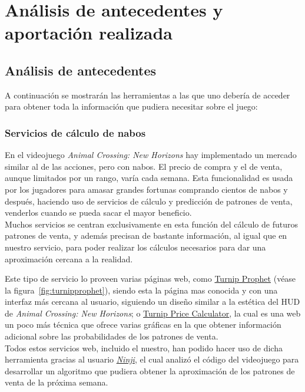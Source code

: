 \chapter{An\'alisis de antecedentes y aportaci\'on realizada}\label{analanteced}

\section{Análisis de antecedentes}

A continuación se mostrarán las herramientas a las que uno debería de acceder para obtener toda la información que pudiera necesitar sobre el juego:

\subsection{Servicios de cálculo de nabos}

En el videojuego \textit{Animal Crossing: New Horizons} hay implementado un mercado similar al de las acciones, pero con nabos. El precio de compra y el de venta, aunque limitados por un rango, varía cada semana. Esta funcionalidad es usada por los jugadores para amasar grandes fortunas comprando cientos de nabos y después, haciendo uso de servicios de cálculo y predicción de patrones de venta, venderlos cuando se pueda sacar el mayor beneficio.\\

Muchos servicios se centran exclusivamente en esta función del cálculo de futuros patrones de venta, y además precisan de bastante información, al igual que en nuestro servicio, para poder realizar los cálculos necesarios para dar una aproximación cercana a la realidad.\\


Este tipo de servicio lo proveen varias páginas web, como \href{https://turnipprophet.io/}{Turnip Prophet} {(v\'ease la figura~\ref{fig:turnipprophet})}, siendo esta la página mas conocida y con una interfaz más cercana al usuario, siguiendo un diseño similar a la estética del HUD de \textit{Animal Crossing: New Horizons}; o \href{https://artem6.github.io/acnh_turnips/}{Turnip Price Calculator}, la cual es una web un poco más técnica que ofrece varias gráficas en la que obtener información adicional sobre las probabilidades de los patrones de venta.\\

Todos estos servicios web, incluido el nuestro, han podido hacer uso de dicha herramienta gracias al usuario \textit{\href{https://twitter.com/_Ninji/status/1244818665851289602?s=20}{Ninji}}, el cual analizó el código del videojuego para desarrollar un algoritmo que pudiera obtener la aproximación de los patrones de venta de la próxima semana.

